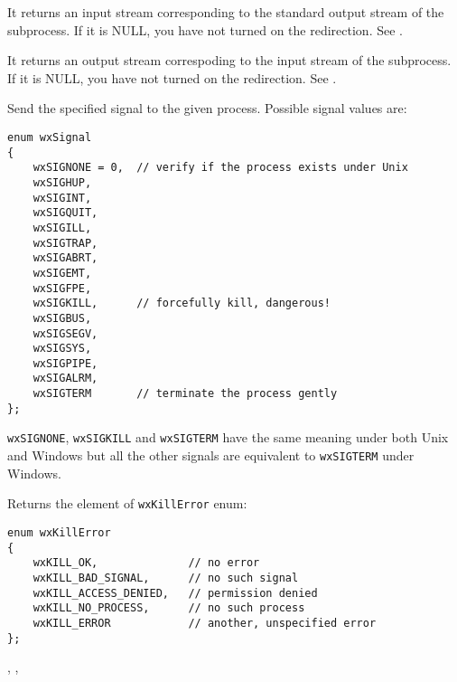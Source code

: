 
It returns an input stream corresponding to the standard output stream of the
subprocess. If it is NULL, you have not turned on the redirection.
See .

\label{wxprocessgetoutputstream}


It returns an output stream correspoding to the input stream of the subprocess.
If it is NULL, you have not turned on the redirection.
See .

\label{wxprocesskill}


Send the specified signal to the given process. Possible signal values are:

\begin{verbatim}
enum wxSignal
{
    wxSIGNONE = 0,  // verify if the process exists under Unix
    wxSIGHUP,
    wxSIGINT,
    wxSIGQUIT,
    wxSIGILL,
    wxSIGTRAP,
    wxSIGABRT,
    wxSIGEMT,
    wxSIGFPE,
    wxSIGKILL,      // forcefully kill, dangerous!
    wxSIGBUS,
    wxSIGSEGV,
    wxSIGSYS,
    wxSIGPIPE,
    wxSIGALRM,
    wxSIGTERM       // terminate the process gently
};
\end{verbatim}

{\tt wxSIGNONE}, {\tt wxSIGKILL} and {\tt wxSIGTERM} have the same meaning
under both Unix and Windows but all the other signals are equivalent to 
{\tt wxSIGTERM} under Windows.

Returns the element of {\tt wxKillError} enum:

\begin{verbatim}
enum wxKillError
{
    wxKILL_OK,              // no error
    wxKILL_BAD_SIGNAL,      // no such signal
    wxKILL_ACCESS_DENIED,   // permission denied
    wxKILL_NO_PROCESS,      // no such process
    wxKILL_ERROR            // another, unspecified error
};
\end{verbatim}


,\rtfsp
{},\rtfsp
{}

\label{wxprocessexists}

